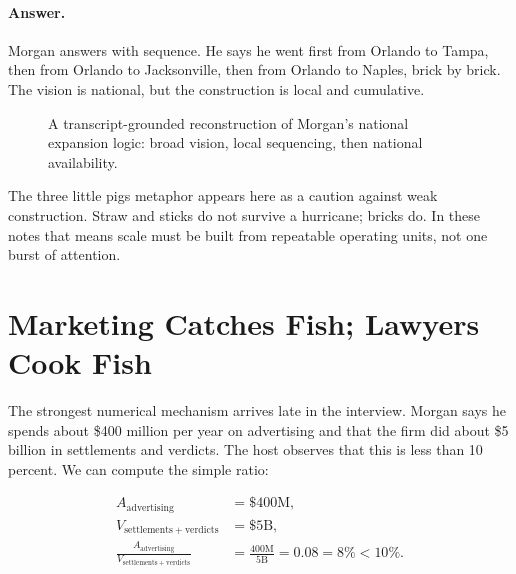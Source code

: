 \paragraph{Answer.}
Morgan answers with sequence. He says he went first from Orlando to Tampa, then from Orlando to Jacksonville, then from Orlando to Naples, brick by brick. The vision is national, but the construction is local and cumulative.

\begin{figure}
\centering
{}
\caption{A transcript-grounded reconstruction of Morgan's national expansion logic: broad vision, local sequencing, then national availability.}
\end{figure}

The three little pigs metaphor appears here as a caution against weak construction. Straw and sticks do not survive a hurricane; bricks do. In these notes that means scale must be built from repeatable operating units, not one burst of attention.

\section{Marketing Catches Fish; Lawyers Cook Fish}

The strongest numerical mechanism arrives late in the interview. Morgan says he spends about \$400 million per year on advertising and that the firm did about \$5 billion in settlements and verdicts. The host observes that this is less than 10 percent. We can compute the simple ratio:

\begin{align}
A_{\mathrm{advertising}} &= \$400\mathrm{M},\\
V_{\mathrm{settlements+verdicts}} &= \$5\mathrm{B},\\
\frac{A_{\mathrm{advertising}}}{V_{\mathrm{settlements+verdicts}}}
&=
\frac{400\mathrm{M}}{5\mathrm{B}}
=
0.08
=
8\%
<
10\%.
\end{align}

